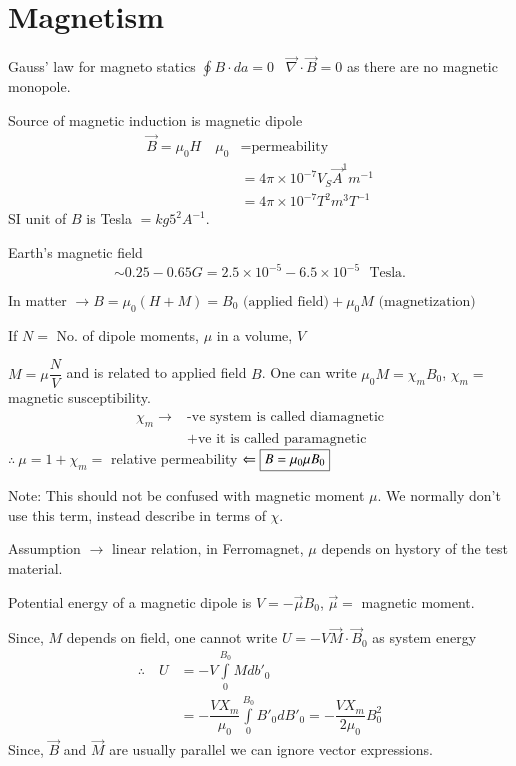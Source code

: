 \section*{Magnetism}

Gauss' law for magneto statics $\oint B\cdot da=0$ \ $\overrightarrow{\nabla}\cdot \overrightarrow{B}=0$ as there are no magnetic monopole.

Source of magnetic induction is magnetic dipole
\begin{align*}
\overrightarrow{B}=\mu_{0}H\quad \mu_{0} &= \text{permeability}\\
&= 4\pi \times 10^{-7}V_{S}\overrightarrow{A}^{1}m^{-1}\\
&= 4\pi \times 10^{-7}T^{2}m^{3}T^{-1}
\end{align*}
SI unit of $B$ is Tesla $=kg5^{2}A^{-1}$.

Earth's magnetic field
$$
\sim 0.25-0.65 G= 2.5\times 10^{-5}-6.5\times 10^{-5}\text{~ Tesla.}
$$

In matter $\to B=\mu_{0}(H+M)=B_{0}\text{ (applied field)} + \mu_{0}M\text{ (magnetization)}$

If $N=$ No. of dipole moments, $\mu$ in a volume, $V$ 

$M=\mu\dfrac{N}{V}$ and is related to applied field $B$. One can write $\mu_{0}M=\chi_{m}B_{0}$, $\chi_{m}=$ magnetic susceptibility.
\begin{align*}
\chi_{m} \to & \text{-ve system is called diamagnetic}\\
            & \text{+ve it is called paramagnetic}
\end{align*}
$\therefore \ \mu=1+\chi_{m}=$ relative permeability $\Leftarrow \fbox{$B=\mu_{0}\mu B_{0}$}$

Note: This should not be confused with magnetic moment $\mu$. We normally don't use this term, instead describe in terms of $\chi$.

Assumption $\to$ linear relation, in Ferromagnet, $\mu$ depends on hystory of the test material.

Potential energy of a magnetic dipole is $V=-\overrightarrow{\mu}B_{0}$, $\overrightarrow{\mu}=$ magnetic moment.

Since, $M$ depends on field, one cannot write $U=-V\overrightarrow{M}\cdot \overrightarrow{B}_{0}$ as system energy
\begin{align*}
\therefore\quad U &= -V\int\limits^{B_{0}}_{0}Mdb'_{0}\\
&= -\dfrac{VX_{m}}{\mu_{0}}\int\limits^{B_{0}}_{0}B'_{0}dB'_{0}=-\dfrac{VX_{m}}{2\mu_{0}}B^{2}_{0}
\end{align*}
Since, $\overrightarrow{B}$ and $\overrightarrow{M}$ are usually parallel we can ignore vector expressions.

